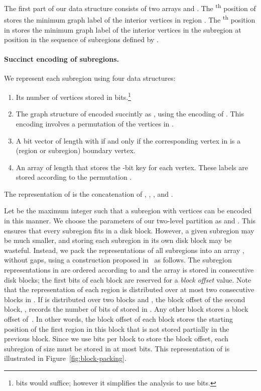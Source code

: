 The first part of our data structure consists of two arrays  and
.
The \textsuperscript{th} position of  stores the minimum graph
label of the interior vertices in region .
The \textsuperscript{th} position in  stores the minimum graph label of the
interior vertices in the subregion  at position  in the
sequence of subregions defined by .

\paragraph{Succinct encoding of subregions.}


We represent each subregion  using four data structures:
\begin{enumerate}
\item Its number of vertices  stored in 
  bits.\footnote{ bits would suffice; however it simplifies the
    analysis to use  bits.}
\item The graph structure of  encoded succintly as
	, using the encoding of 
	\cite{DBLP:journals/siamcomp/ChiangLL05}.
  This encoding involves a permutation  of
  the vertices in .
\item A bit vector  of length  with
   if and only if the corresponding vertex in 
  is a  (region or subregion) boundary vertex.
\item An array  of length  that stores the
  -bit key for each vertex.
  These labels are stored according to the permutation .
\end{enumerate}
The representation of  is the concatenation of ,
, , and .

Let  be the maximum integer such that a subregion with 
vertices can be encoded in this manner. 
We choose the parameters of our two-level partition as  and .
This ensures that every subregion fits in a disk block.
However, a given subregion may be much smaller, and storing
each subregion in its own disk block may be wasteful.
Instead, we pack the representations of all subregions into an array ,
without gaps, using a construction proposed 
in~\cite{DBLP:journals/algorithmica/DillabaughHM12} as follows.
The subregion representations in  are ordered according to 
and the array  is stored in consecutive disk blocks; the first
 bits of each block are reserved for a \emph{block offset}
value.
Note that the representation of each region  is
distributed over at most two consecutive blocks in .
If  is distributed over two blocks  and ,
the block offset of the second block, , records the number of bits
of  stored in .
Any other block stores a block offset of~.
In other words, the block offset of each block stores the starting
position of the first region  in this block that is not
stored partially in the previous block.
Since we use  bits per block to store the block offset, each subregion
of size  must be stored in at most  bits.
This representation of  is illustrated in Figure~\ref{fig:block-packing}.
 

